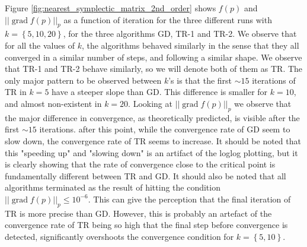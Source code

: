 Figure \ref{fig:nearest_symplectic_matrix_2nd_order} shows $f(p)$ and $\lvert \lvert \operatorname{grad}f(p) \rvert \rvert_{p}$ as a function of iteration for the three different runs with $k=\left\{ 5,10,20 \right\}$, for the three algorithms GD, TR-1 and TR-2. We observe that for all the values of $k$, the algorithms behaved similarly in the sense that they all converged in a similar number of steps, and following a similar shape. We observe that TR-1 and TR-2 behave  similarly, so we will denote both of them as TR. The only major pattern to be observed between $k$'s is that the first $\sim 15$ iterations of TR in $k=5$ have a steeper slope than GD. This difference is smaller for $k=10$, and almost non-existent in $k=20$. Looking at $\lvert \lvert \operatorname{grad}f(p) \rvert \rvert_{p}$ we observe that the major difference in convergence, as theoretically predicted, is visible after the first $\sim 15$ iterations. after this point, while the convergence rate of GD seem to slow down, the convergence rate of TR seems to increase. It should be noted that this "speeding up" and "slowing down" is an artifact of the loglog plotting, but it is clearly showing that the rate of convergence close to the critical point is fundamentally different between TR and GD. It should also be noted that all algorithms terminated as the result of hitting the condition $\lvert \lvert \operatorname{grad}f(p) \rvert \rvert_{p}\leq10^{-6}$. This can give the perception that the final iteration of TR is more precise than GD. However, this is probably an artefact of the convergence rate of TR being so high that the final step before convergence is detected, significantly overshoots the convergence condition for $k=\left\{ 5,10 \right\}$. 

